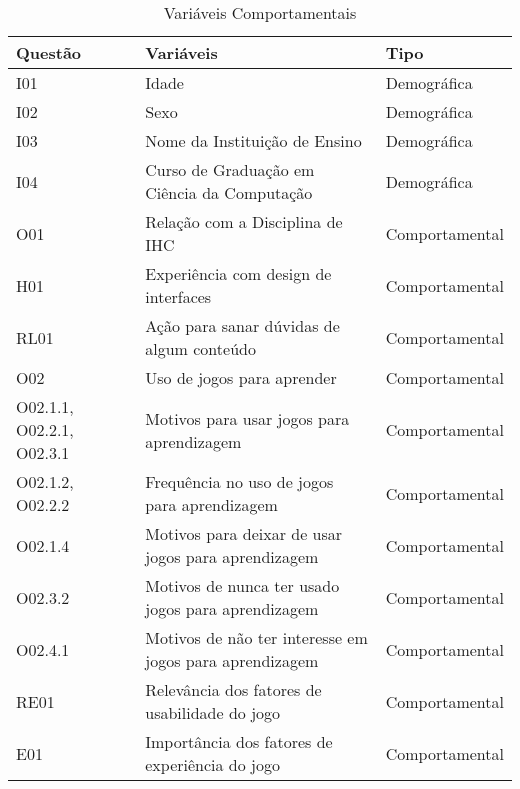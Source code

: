 \begin{table}[htbp]
\centering
\caption{Variáveis Comportamentais}
\label{tab:Table_variaveis-comp}
\begin{tabular}{|p{1.7cm}|p{10cm}|p{3cm}|}
\hline
\textbf{Questão} & \textbf{Variáveis}                         &  \textbf{Tipo }         \\ \hline
I01  & Idade                                      &  Demográfica                         \\ \hline
I02 & Sexo                                       &  Demográfica                             \\ \hline
I03  &  Nome da Instituição de Ensino              &  Demográfica                               \\ \hline
I04 & Curso de Graduação em Ciência da Computação &  Demográfica                             \\ \hline
O01   &  Relação com a Disciplina de IHC             & Comportamental                               \\ \hline
H01   &  Experiência com design de interfaces        & Comportamental                               \\ \hline
RL01   &  Ação para sanar dúvidas de algum conteúdo   & Comportamental                          \\ \hline
O02  &  Uso de jogos para aprender                 & Comportamental                        \\ \hline
O02.1.1, O02.2.1, O02.3.1   &  Motivos para usar jogos para aprendizagem                 & Comportamental    \\ \hline
O02.1.2, O02.2.2   &  Frequência no uso de jogos para aprendizagem               & Comportamental              \\ \hline
O02.1.4  & Motivos para deixar de usar jogos para aprendizagem       & Comportamental                      \\ \hline
O02.3.2  &  Motivos de nunca ter usado jogos para aprendizagem        & Comportamental                     \\ \hline
O02.4.1  & Motivos de não ter interesse em jogos para aprendizagem   & Comportamental                \\ \hline
RE01  & Relevância dos fatores de usabilidade do jogo             & Comportamental                        \\ \hline
E01   & Importância dos fatores de experiência do jogo            & Comportamental                          \\ \hline
\end{tabular}
\end{table}